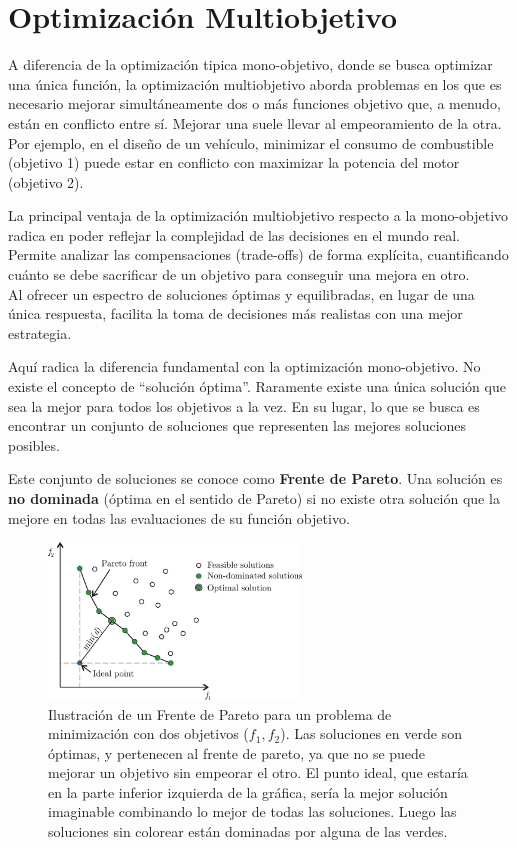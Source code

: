 \documentclass[12pt,a4paper]{book}
\begin{document}
\section{Optimización Multiobjetivo}

A diferencia de la optimización tipica mono-objetivo, donde se busca optimizar una única función, la optimización multiobjetivo aborda problemas en los que es necesario mejorar simultáneamente dos o más funciones objetivo que, a menudo, están en conflicto entre sí. Mejorar una suele llevar al empeoramiento de la otra. Por ejemplo, en el diseño de un vehículo, minimizar el consumo de combustible (objetivo 1) puede estar en conflicto con maximizar la potencia del motor (objetivo 2).

La principal ventaja de la optimización multiobjetivo respecto a la mono-objetivo radica en poder reflejar la complejidad de las decisiones en el mundo real.
Permite analizar las compensaciones (trade-offs) de forma explícita, cuantificando cuánto se debe sacrificar de un objetivo para conseguir una mejora en otro.\\
Al ofrecer un espectro de soluciones óptimas y equilibradas, en lugar de una única respuesta, facilita la toma de decisiones más realistas con una mejor estrategia.

Aquí radica la diferencia fundamental con la optimización mono-objetivo. No existe el concepto de ``solución óptima''. Raramente existe una única solución que sea la mejor para todos los objetivos a la vez. En su lugar, lo que se busca es encontrar un conjunto de soluciones que representen las mejores soluciones posibles.

Este conjunto de soluciones se conoce como \textbf{Frente de Pareto}. Una solución es \textbf{no dominada} (óptima en el sentido de Pareto) si no existe otra solución que la mejore en todas las evaluaciones de su función objetivo.

\begin{figure}[H]
    \centering
    \includegraphics[width=0.6\textwidth]{images/pareto_front.png}
    \caption{Ilustración de un Frente de Pareto para un problema de minimización con dos objetivos ($f_1, f_2$). Las soluciones en verde son óptimas, y pertenecen al frente de pareto, ya que no se puede mejorar un objetivo sin empeorar el otro. El punto ideal, que estaría en la parte inferior izquierda de la gráfica, sería la mejor solución imaginable combinando lo mejor de todas las soluciones. Luego las soluciones sin colorear están dominadas por alguna de las verdes\cite{Bre2017}.}
    \label{fig:pareto}
\end{figure}
\end{document}
